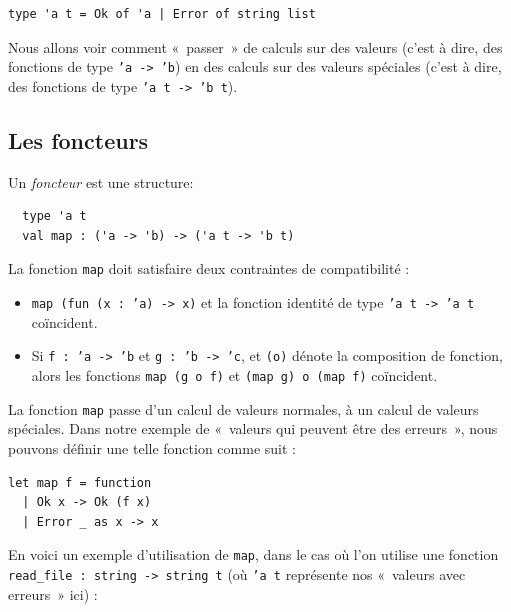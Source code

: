 \documentclass[final]{jflart}
\begin{document}
\begin{verbatim}
type 'a t = Ok of 'a | Error of string list
\end{verbatim}

Nous allons voir comment
«~passer~» de calculs sur des valeurs (c'est à dire, des fonctions de type
\texttt{'a -> 'b}) en des calculs sur des valeurs spéciales (c'est à dire, des
fonctions de type \texttt{'a t -> 'b t}).

\subsection{Les foncteurs}

\begin{defi}[Foncteur]
  Un \emph{foncteur} %
  est une structure:

  \begin{verbatim}
  type 'a t
  val map : ('a -> 'b) -> ('a t -> 'b t)
  \end{verbatim}

  La fonction \texttt{map} doit satisfaire deux contraintes de compatibilité :
  \begin{itemize}
  \item \texttt{map (fun (x : 'a) -> x)} et la fonction identité de type \texttt{'a t -> 'a t} coïncident.
  \item Si \texttt{f : 'a -> 'b} et \texttt{g
      : 'b -> 'c}, et \texttt{(o)} dénote la composition de fonction, alors les
    fonctions \texttt{map (g o f)} et \texttt{(map g) o (map f)}
    coïncident.
  \end{itemize}
\end{defi}

La fonction \texttt{map} passe d'un calcul de valeurs normales, à un calcul
de valeurs spéciales. Dans notre exemple de «~valeurs qui peuvent être des erreurs~», nous
pouvons définir une telle fonction comme suit :

\begin{verbatim}
let map f = function
  | Ok x -> Ok (f x)
  | Error _ as x -> x
\end{verbatim}

En voici un exemple d'utilisation de \texttt{map}, dans le cas où l'on utilise une fonction \texttt{read\_file : string -> string t} (où \texttt{'a t} représente nos «~valeurs avec erreurs~» ici) :
\end{document}
